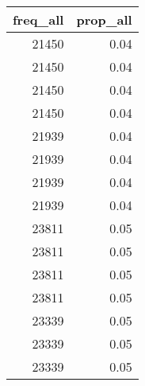 \begin{tabular}{rr}
  \toprule
 freq\_all & prop\_all \\ 
  \midrule
  21450 & 0.04 \\ 
  21450 & 0.04 \\ 
  21450 & 0.04 \\ 
  21450 & 0.04 \\ 
  21939 & 0.04 \\ 
  21939 & 0.04 \\ 
  21939 & 0.04 \\ 
  21939 & 0.04 \\ 
  23811 & 0.05 \\ 
  23811 & 0.05 \\ 
  23811 & 0.05 \\ 
  23811 & 0.05 \\ 
  23339 & 0.05 \\ 
  23339 & 0.05 \\ 
  23339 & 0.05 \\ 
   \bottomrule
\end{tabular}
